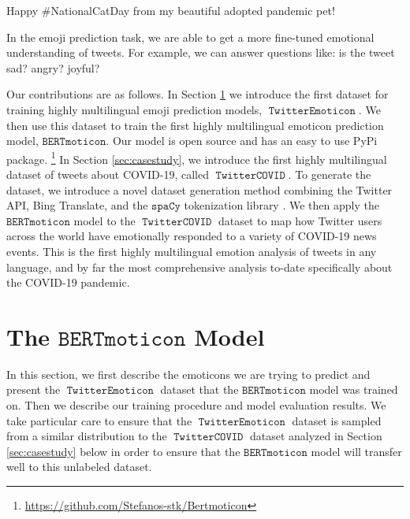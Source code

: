\documentclass[11pt]{article}
\newcommand{\XXX}{{\color{red}\textbf{XXX}}~}
\newcommand{\bertmoji}{\texttt{BERTmoticon}}
\newcommand{\spacy}{\texttt{spaCy}}
\DeclareMathOperator{\emoticon}{\texttt{TwitterEmoticon}}
\DeclareMathOperator{\corona}{\texttt{TwitterCOVID}}
\begin{document}
\begin{displayquote}
    Happy \#NationalCatDay from my beautiful adopted pandemic pet!   
\end{displayquote}

In the emoji prediction task, we are able to get a more fine-tuned emotional understanding of tweets. For example, we can answer questions like: is the tweet sad? angry? joyful?


Our contributions are as follows.
In Section \ref{sec:bertmoji} we introduce the first dataset for training highly multilingual emoji prediction models, $\emoticon$.
We then use this dataset to train the first highly multilingual emoticon prediction model, $\bertmoji$.
Our model is open source and has an easy to use PyPi package.%
\footnote{
    \url{https://github.com/Stefanos-stk/Bertmoticon}
}
In Section \ref{sec:casestudy}, we introduce the first highly multilingual dataset of tweets about COVID-19, called $\corona$.
To generate the dataset, we introduce a novel dataset generation method combining the Twitter API, Bing Translate, and the $\spacy$ tokenization library \citep{spacy2}.
We then apply the $\bertmoji$ model to the $\corona$ dataset to map how Twitter users across the world have emotionally responded to a variety of COVID-19 news events.
This is the first highly multilingual emotion analysis of tweets in any language,
and by far the most comprehensive analysis to-date specifically about the COVID-19 pandemic.


\section{The $\bertmoji$ Model}
\label{sec:bertmoji}

In this section, we first describe the emoticons we are trying to predict and present the $\emoticon$ dataset that the $\bertmoji$ model was trained on.
Then we describe our training procedure and model evaluation results.
We take particular care to ensure that the $\emoticon$ dataset is sampled from a similar distribution to the $\corona$ dataset analyzed in Section \ref{sec:casestudy} below in order to ensure that the $\bertmoji$ model will transfer well to this unlabeled dataset.
\end{document}
